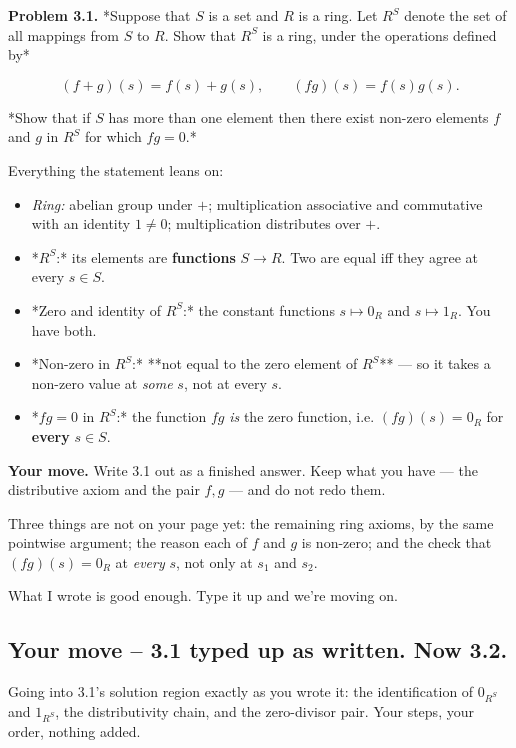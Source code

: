 \documentclass[11pt]{article}
\newenvironment{studentturn}[1]{%
  \par\medskip\needspace{4\baselineskip}%
  \noindent{\small\bfseries\sffamily #1}\par\nopagebreak\smallskip
  \begingroup\setlength{\leftskip}{1.2em}%
}{\endgroup\par\medskip}
\begin{document}
\textbf{Problem 3.1.} *Suppose that $S$ is a set and $R$ is a ring. Let $R^S$ denote the set of all mappings from $S$ to $R$. Show that $R^S$ is a ring, under the operations defined by*

$$(f+g)(s) = f(s) + g(s), \qquad (fg)(s) = f(s)g(s).$$

*Show that if $S$ has more than one element then there exist non-zero elements $f$ and $g$ in $R^S$ for which $fg = 0$.*

Everything the statement leans on:

\begin{itemize}
  \item \emph{Ring:} abelian group under $+$; multiplication associative and commutative with an identity $1 \neq 0$; multiplication distributes over $+$.
  \item *$R^S$:* its elements are \textbf{functions} $S \to R$. Two are equal iff they agree at every $s \in S$.
  \item *Zero and identity of $R^S$:* the constant functions $s \mapsto 0_R$ and $s \mapsto 1_R$. You have both.
  \item *Non-zero in $R^S$:* **not equal to the zero element of $R^S$** --- so it takes a non-zero value at \emph{some} $s$, not at every $s$.
  \item *$fg = 0$ in $R^S$:* the function $fg$ \emph{is} the zero function, i.e. $(fg)(s) = 0_R$ for \textbf{every} $s \in S$.
\end{itemize}

\textbf{Your move.} Write 3.1 out as a finished answer. Keep what you have --- the distributive axiom and the pair $f, g$ --- and do not redo them.

Three things are not on your page yet: the remaining ring axioms, by the same pointwise argument; the reason each of $f$ and $g$ is non-zero; and the check that $(fg)(s) = 0_R$ at \emph{every} $s$, not only at $s_1$ and $s_2$.


\begin{studentturn}{You said, 2026-09-02 11:22:26}
What I wrote is good enough. Type it up and we're moving on.
\end{studentturn}

\subsection*{Your move -- 3.1 typed up as written. Now 3.2.}
Going into 3.1's solution region exactly as you wrote it: the identification of $0_{R^S}$ and $1_{R^S}$, the distributivity chain, and the zero-divisor pair. Your steps, your order, nothing added.
\end{document}
